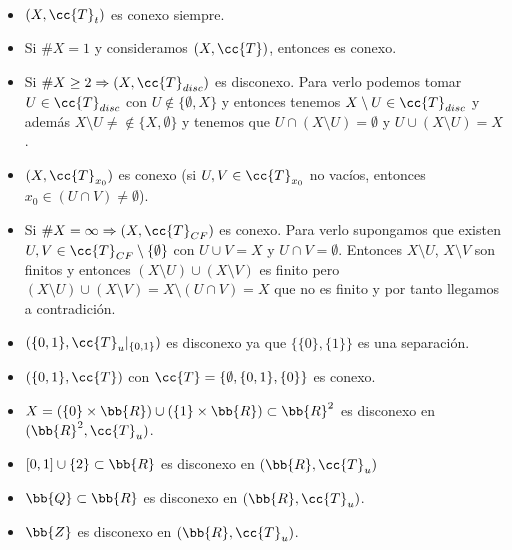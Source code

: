\begin{ejemplo}\
    \begin{itemize}
        \item $(X, \cc{T}_t)$ es conexo siempre.
        \item Si $\#X=1$ y consideramos $(X, \cc{T})$, entonces es conexo.
        \item Si $\#X\geq 2 \Rightarrow (X, \cc{T}_{disc})$ es disconexo. Para verlo podemos tomar $U\in \cc{T}_{disc}$ con $U\notin \{\emptyset, X\}$ y entonces tenemos $X\setminus U\in \cc{T}_{disc}$ y además $X\setminus U\neq \notin \{X, \emptyset\}$ y tenemos que $U\cap (X\setminus U) = \emptyset$ y $U\cup (X\setminus U) = X$.
        \item $(X, \cc{T}_{x_0})$ es conexo (si $U,V\in \cc{T}_{x_0}$ no vacíos, entonces $x_0\in (U\cap V) \neq \emptyset$).
        \item Si $\#X=\infty \Rightarrow (X, \cc{T}_{CF})$ es conexo. Para verlo supongamos que existen $U,V\in \cc{T}_{CF}\setminus \{\emptyset\}$ con $U\cup V =X$ y $U\cap V = \emptyset$. Entonces $X\setminus U$, $X\setminus V$ son finitos y entonces $(X\setminus U)\cup (X\setminus V)$ es finito pero $(X\setminus U)\cup (X\setminus V) = X \setminus (U\cap V) = X$ que no es finito y por tanto llegamos a contradición.
        \item $(\{0,1\}, \cc{T}_u|_{\{0,1\}})$ es disconexo ya que $\{\{0\}, \{1\}\}$ es una separación.
        \item $(\{0,1\}, \cc{T})$ con $\cc{T}=\{\emptyset, \{0,1\}, \{0\}\}$ es conexo.
        \item $X=(\{0\}\times \bb{R})\cup (\{1\}\times \bb{R})\subset \bb{R}^2$ es disconexo en $(\bb{R}^2, \cc{T}_u)$.
        \item $[0,1]\cup \{2\}\subset \bb{R}$ es disconexo en $(\bb{R}, \cc{T}_u)$ 
        \item $\bb{Q}\subset \bb{R}$ es disconexo en $(\bb{R}, \cc{T}_u)$.
        \item $\bb{Z}$ es disconexo en $(\bb{R}, \cc{T}_u)$.
    \end{itemize}
    \endsquare
\end{ejemplo}

